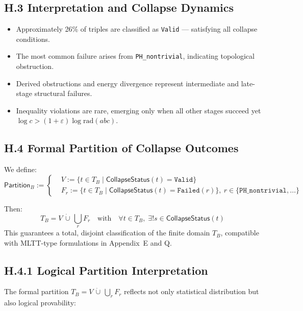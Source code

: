 \documentclass[11pt]{article}
\begin{document}
\subsection*{H.3 Interpretation and Collapse Dynamics}

\begin{itemize}
  \item Approximately 26\% of triples are classified as \texttt{Valid} — satisfying all collapse conditions.
  \item The most common failure arises from \texttt{PH\_nontrivial}, indicating topological obstruction.
  \item Derived obstructions and energy divergence represent intermediate and late-stage structural failures.
  \item Inequality violations are rare, emerging only when all other stages succeed yet \( \log c > (1+\varepsilon)\log \mathrm{rad}(abc) \).
\end{itemize}

\subsection*{H.4 Formal Partition of Collapse Outcomes}

We define:
\[
\mathsf{Partition}_B := \left\{
\begin{aligned}
& V := \{ t \in T_B \mid \mathsf{CollapseStatus}(t) = \texttt{Valid} \} \\
& F_r := \{ t \in T_B \mid \mathsf{CollapseStatus}(t) = \texttt{Failed}(r) \},\ r \in \{\texttt{PH\_nontrivial}, \ldots \}
\end{aligned}
\right.
\]

Then:
\[
T_B = V \,\dot{\cup}\, \bigcup_{r} F_r
\quad\text{with}\quad \forall t \in T_B,\; \exists! s \in \mathsf{CollapseStatus}(t)
\]
This guarantees a total, disjoint classification of the finite domain \( T_B \),  
compatible with MLTT-type formulations in Appendix~E and Q.

\subsection*{H.4.1 Logical Partition Interpretation}

The formal partition \( T_B = V \,\dot{\cup}\, \bigcup_{r} F_r \) reflects not only statistical distribution but also logical provability:
\end{document}

